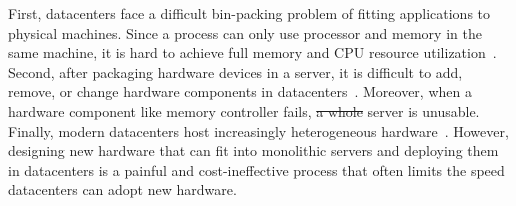 \documentclass[10pt,times,twocolumn]{z2-article}
\renewcommand{\em}{\it}
\providecommand{\DIFaddtex}[1]{{\protect\color{blue}\uwave{#1}}} %
\providecommand{\DIFdeltex}[1]{{\protect\color{red}\sout{#1}}}                      %
\providecommand{\DIFaddbegin}{} %
\providecommand{\DIFaddend}{} %
\providecommand{\DIFdelbegin}{} %
\providecommand{\DIFdelend}{} %
\providecommand{\DIFadd}[1]{\texorpdfstring{\DIFaddtex{#1}}{#1}} %
\providecommand{\DIFdel}[1]{\texorpdfstring{\DIFdeltex{#1}}{}} %
\newcommand{\DIFscaledelfig}{0.5}
\newlength{\DIFdelgraphicswidth} %
\newlength{\DIFdelgraphicsheight} %
\newcommand{\DIFaddincludegraphics}[2][]{{\color{blue}\fbox{\DIFOincludegraphics[#1]{#2}}}} %
\newcommand{\DIFdelincludegraphics}[2][]{%
\sbox{\DIFdelgraphicsbox}{\DIFOincludegraphics[#1]{#2}}%
\settoboxwidth{\DIFdelgraphicswidth}{\DIFdelgraphicsbox} %
\settoboxtotalheight{\DIFdelgraphicsheight}{\DIFdelgraphicsbox} %
\scalebox{\DIFscaledelfig}{%
\parbox[b]{\DIFdelgraphicswidth}{\usebox{\DIFdelgraphicsbox}\\[-\baselineskip] \rule{\DIFdelgraphicswidth}{0em}}\llap{\resizebox{\DIFdelgraphicswidth}{\DIFdelgraphicsheight}{%
\setlength{\unitlength}{\DIFdelgraphicswidth}%
\begin{picture}(1,1)%
\thicklines\linethickness{2pt} %
{\color[rgb]{1,0,0}\put(0,0){\framebox(1,1){}}}%
{\color[rgb]{1,0,0}\put(0,0){\line( 1,1){1}}}%
{\color[rgb]{1,0,0}\put(0,1){\line(1,-1){1}}}%
\end{picture}%
}\hspace*{3pt}}} %
} %
\DeclareRobustCommand{\DIFaddbegin}{\DIFOaddbegin \let\includegraphics\DIFaddincludegraphics} %
\DeclareRobustCommand{\DIFaddend}{\DIFOaddend \let\includegraphics\DIFOincludegraphics} %
\DeclareRobustCommand{\DIFdelbegin}{\DIFOdelbegin \let\includegraphics\DIFdelincludegraphics} %
\DeclareRobustCommand{\DIFdelend}{\DIFOaddend \let\includegraphics\DIFOincludegraphics} %
\begin{document}
First, datacenters face a difficult bin-packing problem of fitting applications to physical machines.
Since a process can only use processor and memory in the same machine, 
it is hard to achieve full memory and CPU resource utilization~\cite{Barroso-COMPUTER,Quasar-ASPLOS,PowerNap}.
Second, after packaging hardware devices in a server, it is difficult to add, remove, or change 
hardware components in datacenters~\cite{FB-Wedge100}. 
Moreover, when a hardware component like \DIFaddbegin \DIFadd{a }\DIFaddend memory controller fails, \DIFdelbegin \DIFdel{a whole }\DIFdelend \DIFaddbegin \DIFadd{the entire }\DIFaddend server is unusable.
Finally, modern datacenters host increasingly heterogeneous hardware~\cite{sigarch-dc,Putnam14-FPGA,TPU,DPU}.
However, designing new hardware that can fit into monolithic servers and deploying them in datacenters
is a painful and cost-ineffective process 
that often limits the speed \DIFaddbegin \DIFadd{that }\DIFaddend datacenters can adopt new hardware.

\DIFdelbegin %
\end{document}
